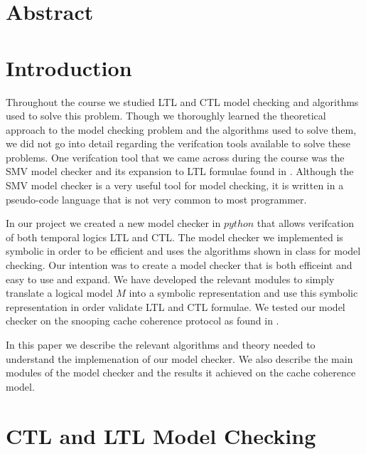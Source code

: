 \documentclass[11pt]{article}
\begin{document}
\maketitle


\section{Abstract}

\section{Introduction}
   Throughout the course we studied LTL and CTL model checking and algorithms
   used to solve this problem. Though we thoroughly learned the theoretical 
   approach to the model checking problem and the algorithms used to solve them, we did not
   go into detail regarding the verifcation tools available to solve these problems.
   One verifcation tool that we came across during the course was the SMV model
   checker and its expansion to LTL formulae found in \cite{ltl}. Although the
   SMV model checker is a very useful tool for model checking, it is written
   in a pseudo-code language that is not very common to most programmer.
   
   In our project we created a new model checker in $python$ that allows
   verifcation of both temporal logics LTL and CTL. The model checker we
   implemented is symbolic in order to be efficient and uses the algorithms
   shown in class for model checking. Our intention was to create a model
   checker that is both efficeint and easy to use and expand. We have developed
   the relevant modules to simply translate a logical model $M$ into a symbolic
   representation and use this symbolic representation in order validate
   LTL and CTL formulae.
   We tested our model checker on the snooping cache coherence protocol as
   found in \cite{cache}. 
   
   In this paper we describe the relevant algorithms and theory needed to
   understand the implemenation of our model checker. We also describe the 
   main modules of the model checker and the results it achieved on the 
   cache coherence model.

\section{CTL and LTL Model Checking}
\end{document}
